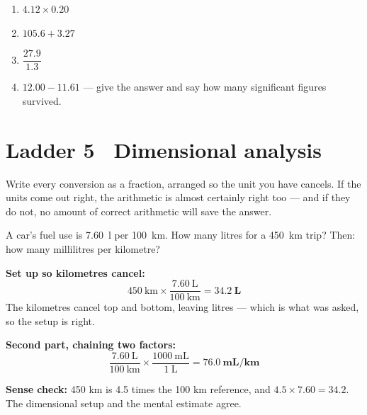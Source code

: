\documentclass{apchem-worksheet}
\begin{document}
\begin{yourturn}
\begin{enumerate}[leftmargin=*,itemsep=0.5em]
  \item $4.12 \times 0.20$ \workspace[1.2cm]
  \item $105.6 + 3.27$ \workspace[1.2cm]
  \item $\dfrac{27.9}{1.3}$ \workspace[1.2cm]
  \item $12.00 - 11.61$ --- give the answer and say how many significant
        figures survived. \workspace[1.4cm]
\end{enumerate}
\end{yourturn}

\section*{\sffamily Ladder 5 \textbullet\ Dimensional analysis}

Write every conversion as a fraction, arranged so the unit you have
cancels. If the units come out right, the arithmetic is almost certainly
right too --- and if they do not, no amount of correct arithmetic will
save the answer.

\begin{workedexample}
A car's fuel use is \SI{7.60}{\litre} per \SI{100}{\kilo\meter}. How many
litres for a \SI{450}{\kilo\meter} trip? Then: how many millilitres per
kilometre?

\textbf{Set up so kilometres cancel:}
\[ 450~\text{km} \times \frac{7.60~\text{L}}{100~\text{km}}
   = \mathbf{34.2~L} \]
The kilometres cancel top and bottom, leaving litres --- which is what
was asked, so the setup is right.

\textbf{Second part, chaining two factors:}
\[ \frac{7.60~\text{L}}{100~\text{km}}
   \times \frac{1000~\text{mL}}{1~\text{L}}
   = \mathbf{76.0~mL/km} \]

\textbf{Sense check:} 450 km is 4.5 times the 100 km reference, and
$4.5 \times 7.60 = 34.2$. The dimensional setup and the mental estimate
agree.
\end{workedexample}
\end{document}
